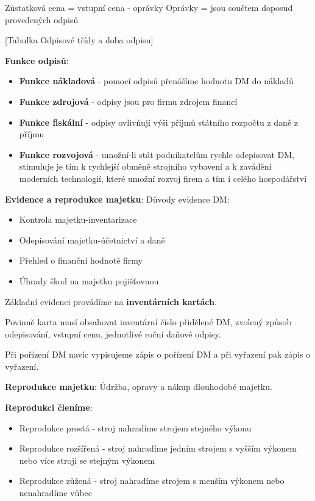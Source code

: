 \documentclass[11pt,a4paper,twoside]{book}
\begin{document}
	\begin{center}
	Zůstatková cena = vstupní cena - oprávky
	Oprávky = jsou součtem doposud provedených odpisů	
	\end{center}

	[Tabulka Odpisové třídy a doba odpisu]

	\textbf{Funkce odpisů}:
	\begin{itemize}
		\item \textbf{Funkce nákladová} - pomocí odpisů přenášíme hodnotu DM do nákladů
		\item \textbf{Funkce zdrojová} - odpisy jsou pro firmu zdrojem financí
		\item \textbf{Funkce fiskální} - odpisy ovlivňují výši příjmů státního rozpočtu z daně z příjmu
		\item \textbf{Funkce rozvojová} - umožní-li stát podnikatelům rychle odepisovat DM, stimuluje je tím k rychlejší obměně strojního vybavení a k zavádění moderních technologií, které umožní rozvoj firem a tím i celého hospodářství
	\end{itemize}

	\textbf{Evidence a reprodukce majetku}:
	Důvody evidence DM:
	\begin{itemize}
		\item Kontrola majetku-inventarizace
		\item Odepisování majetku-účetnictví a daně
		\item Přehled o finanční hodnotě firmy
		\item Úhrady škod na majetku pojišťovnou
	\end{itemize}

	Základní evidenci provádíme na \textbf{inventárních kartách}.

	Povinně karta musí obsahovat inventární číslo přidělené DM, zvolený způsob odepisování, vstupní cenu, jednotlivé roční daňové odpisy.

	Při pořízení DM navíc vypisujeme zápis o pořízení DM a při vyřazení pak zápis o vyřazení.

	\textbf{Reprodukce majetku}:
	Údržba, opravy a nákup dlouhodobé majetku.

	\textbf{Reprodukci členíme}:
	\begin{itemize}
		\item Reprodukce prostá - stroj nahradíme strojem stejného výkonu
		\item Reprodukce rozšířená - stroj nahradíme jedním strojem s vyšším výkonem nebo více stroji se stejným výkonem
		\item Reprodukce zůžená - stroj nahradíme strojem s menším výkonem nebo nenahradíme vůbec
	\end{itemize}
\end{document}
